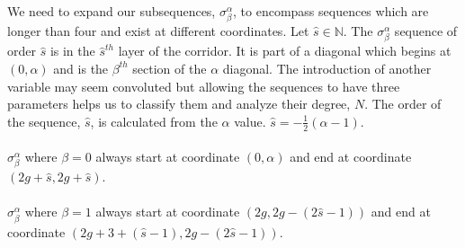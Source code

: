 \documentclass{article}
\newcommand\tab[1][1cm]{\hspace*{#1}}
\newcommand*{\set}[1]{\mathbb{#1}}
\theoremstyle{definition}
\begin{document}
  \tab We need to expand our subsequences, $\sigma_{\beta}^{\alpha}$, to encompass sequences which are longer than four and 
  exist at different coordinates. Let $\hat{s} \in \set{N}$. 
  The $\sigma_{\beta}^{\alpha}$ sequence of order $\hat{s}$ is in the $\hat{s}^{th}$ layer of the corridor. It is part of a diagonal which begins at $(0, \alpha)$ and is the $\beta^{th}$
  section of the $\alpha$ diagonal. The introduction of another variable may seem convoluted but allowing the sequences to have three parameters helps us 
  to classify them and analyze their degree, $N$. The order of the sequence, $\hat{s}$, is calculated from the $\alpha$ value. $\hat{s} = -\frac{1}{2}(\alpha-1)$.\\\\
  $\sigma_{\beta}^{\alpha}$ where $\beta = 0$ always start at coordinate $(0, \alpha)$ and end at coordinate $(2g + \hat{s}, 2g + \hat{s})$.\\\\
  $\sigma_{\beta}^{\alpha}$ where $\beta = 1$ always start at coordinate $(2g, 2g-(2\hat{s}-1))$ and end at coordinate $(2g + 3+(\hat{s}-1), 2g - (2\hat{s}-1))$.
  
  

		
  
  
\end{document}
